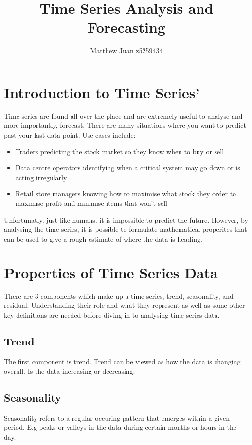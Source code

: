 \documentclass{article}
\title{Time Series Analysis and Forecasting}
\author{Matthew Juan z5259434}
\date{}
\begin{document}
  \maketitle

  \newpage
  \doublespacing
  \tableofcontents
  \singlespacing
  \newpage
  \section{Introduction to Time Series'}
  Time series are found all over the place and are extremely useful
  to analyse and more importantly, forecast. There are many situations where
  you want to predict past your last data point.
  Use cases include:
  \begin{itemize}
    \item Traders predicting the stock market so they know when to buy or sell
    \item Data centre operators identifying when a critical system may go down or is acting irregularly
    \item Retail store managers knowing how to maximise what stock they order to maximise profit and minimise items that won't sell
  \end{itemize}
  Unfortunatly, just like humans, it is impossible to predict the future.
  However, by analysing the time series, it is possible to formulate
  mathematical properites that can be used to give a rough estimate of
  where the data is heading.

  \section{Properties of Time Series Data}
  There are 3 components which make up a time series, trend, seasonality, and residual. Understanding their role and what they represent as well as some other key definitions are needed before diving in to analysing time series data.
  \subsection{Trend}
  The first component is trend. Trend can be viewed as how the data is changing overall. Is the data increasing or decreasing.
  \subsection{Seasonality}
  Seasonality refers to a regular occuring pattern that emerges within a given period. E.g peaks or valleys in the data during certain months or hours in the day.
\end{document}
